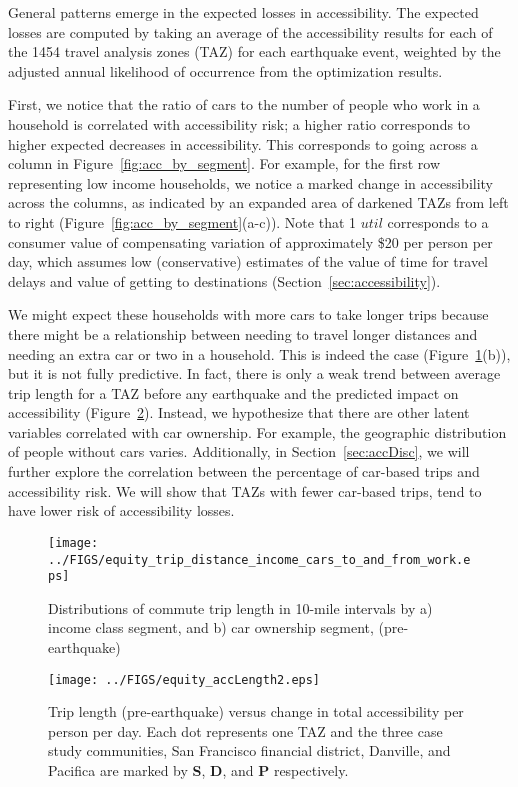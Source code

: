 General patterns emerge in the expected losses in accessibility.
The expected losses are computed by taking an average of the accessibility results for each of the 1454 travel analysis zones (TAZ) for each earthquake event, weighted by the adjusted annual likelihood of occurrence from the optimization results. 

First, we notice that the ratio of cars to the number of people who work in a household is  correlated with accessibility risk; a higher ratio corresponds to higher expected decreases in accessibility. This corresponds to going across a column in Figure~\ref{fig:acc_by_segment}. For example, for the first row representing low income households, 
 we notice a marked change in accessibility across the columns, as indicated by an expanded area of darkened TAZs from left to right (Figure~\ref{fig:acc_by_segment}{(a-c)}). Note that 1 $util$ corresponds to a consumer value of compensating variation of approximately \$20 per person per day, which assumes low (conservative) estimates of the value of time for travel delays and value of getting to destinations (Section~\ref{sec:accessibility}). 
 
We might expect these households with more cars to take longer trips because there might be a relationship between needing to travel longer distances and needing an extra car or two in a household. This is indeed the case (Figure~\ref{fig:lengthIncomeBars}{(b)}), but it is not fully predictive. In fact, there is only a weak trend between average trip length for a TAZ before any earthquake and the predicted impact on accessibility (Figure~\ref{fig:accLength}). Instead, we hypothesize that there are other latent variables correlated with car ownership. For example, the geographic distribution of people without cars varies. Additionally, in Section~\ref{sec:accDisc}, we will further explore the correlation between the percentage of car-based trips and accessibility risk. We will show that TAZs with fewer car-based trips, tend to have lower risk of accessibility losses.



\begin{figure}[h!]
\centering
\texttt{[image: ../FIGS/equity\_trip\_distance\_income\_cars\_to\_and\_from\_work.eps]} 
\caption{Distributions of commute trip length in 10-mile intervals  by a) income class segment, and b) car ownership segment,  (pre-earthquake)}
\label{fig:lengthIncomeBars}
\end{figure}

%
\begin{figure}[h!]
\centering
\texttt{[image: ../FIGS/equity\_accLength2.eps]} 
\caption{Trip length (pre-earthquake) versus change in total accessibility per person per day. Each dot represents one TAZ and the three case study communities, San Francisco financial district, Danville, and Pacifica are marked by \textbf{S}, \textbf{D}, and \textbf{P} respectively.}
\label{fig:accLength}
\end{figure}



